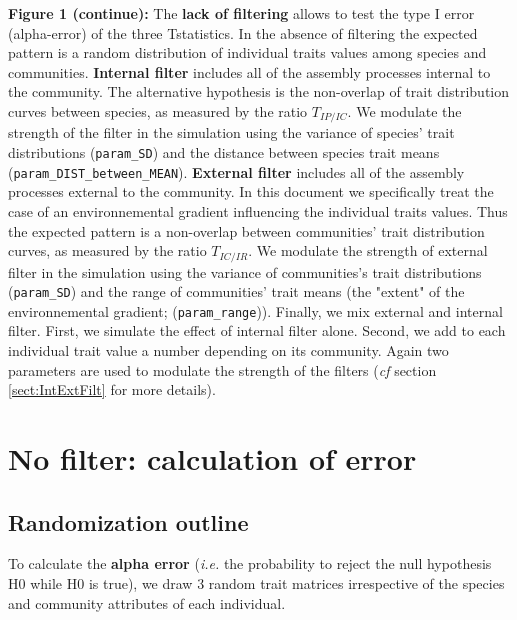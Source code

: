 \documentclass[12pt]{article}\usepackage[]{graphicx}\usepackage[]{color}
\begin{document}
\clearpage
\textbf{Figure 1 (continue):} The \textbf{lack of filtering} allows to test the type I error (alpha-error) of the three Tstatistics. In the absence of filtering the expected pattern is a random distribution of individual traits values among species and communities.
\textbf{Internal filter} includes all of the assembly processes internal to the community. The alternative hypothesis is the non-overlap of trait distribution curves between species, as measured by the ratio $T_{IP/IC}$. We modulate the strength of the filter in the simulation using the variance of species' trait distributions (\texttt{param\_{}SD}) and the distance between species trait means (\texttt{param\_{}DIST\_{}between\_{}MEAN}). 
\textbf{External filter} includes all of the assembly processes external to the community. In this document we specifically treat the case of an environnemental gradient influencing the individual traits values. Thus the expected pattern is a non-overlap between communities' trait distribution curves, as measured by the ratio $T_{IC/IR}$. We modulate the strength of external filter in the simulation using the variance of communities's trait distributions (\texttt{param\_{}SD}) and the range of communities' trait means (the "extent" of the environnemental gradient; (\texttt{param\_{}range})). 
Finally, we mix external and internal filter. First, we simulate the effect of internal filter alone. Second, we add to each individual trait value a number depending on its community. Again two parameters are used to modulate the strength of the filters (\textit{cf} section \ref{sect:IntExtFilt} for more details). 
\vspace*{1cm}


\cleardoublepage

\section{No filter: calculation of error}
 \subsection {Randomization outline}

To calculate the \textbf{alpha error} (\textit{i.e.} the probability to reject the null hypothesis H0 while H0 is true), we draw 3 random trait matrices irrespective of the species and community attributes of each individual.
\end{document}
